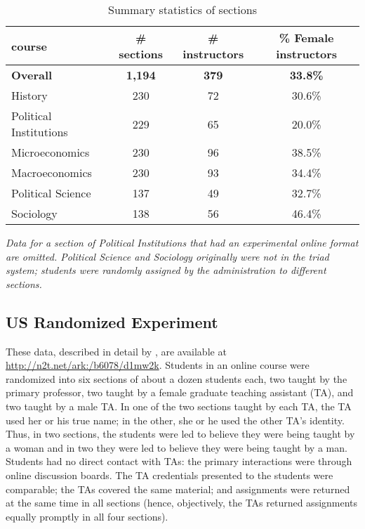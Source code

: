 \documentclass[12pt]{article}
\begin{document}
\begin{table}[htbp]
  \centering
  \footnotesize 
  \caption{Summary statistics of sections}
    \begin{tabular}{lccc}
    \toprule 
    course     & \# sections & \# instructors  & \% Female instructors  \\
   \midrule
  \textbf{Overall} &  \textbf{1,194} & \textbf{379}  &\textbf{33.8\%} \\
    History    &               230 &      72          &   30.6\% \\
    Political Institutions  &  229 &      65          &   20.0\% \\    
    Microeconomics   &         230 &      96          &   38.5\% \\
    Macroeconomics   &         230 &      93          &   34.4\% \\
    Political Science &       137 &      49          &   32.7\% \\
    Sociology   &              138 &      56          &   46.4\%    \\
    \bottomrule
    \end{tabular}%
 \label{tab:description}%
 
\textit{Data for a section of Political Institutions that 
had an experimental online format are omitted.
Political Science and Sociology originally were not in the triad system; 
students were randomly assigned by the administration to different sections.
} 

\end{table}%
\normalsize

\subsection{US Randomized Experiment}
These data, described in detail by \cite{MacNell2014}, are available at 
\url{http://n2t.net/ark:/b6078/d1mw2k}.
Students in an online course were randomized into six sections of about a dozen students each, 
two taught by the primary professor,
two taught by a female graduate teaching assistant (TA), and two taught by a male TA.
In one of the two sections taught by each TA, the TA used her or his
true name; in the other, she or he used the other TA's identity.
Thus, in two sections, the students were led to believe they were being taught by a woman
and in two they were led to believe they were being taught by a man.
Students had no direct contact with TAs: the primary interactions were through
online discussion boards.
The TA credentials presented to the students were comparable; the TAs covered
the same material; and assignments were returned at the same time in all sections
(hence, objectively, the TAs returned assignments equally promptly in all four sections).
\end{document}
